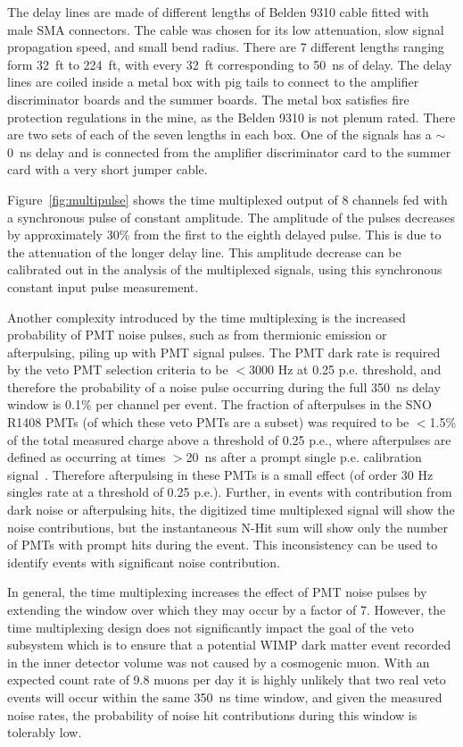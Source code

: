 \documentclass[review,number,sort&compress]{elsarticle}
\begin{document}
The delay lines are made of different lengths of Belden 9310 cable
fitted with male SMA connectors. The cable was chosen for its low
attenuation, slow signal propagation speed, and small bend radius.
There are 7 different lengths ranging form 32~ft to 224~ft, with every
32~ft corresponding to 50~ns of delay. The delay lines are coiled
inside a metal box with pig tails to connect to the amplifier
discriminator boards and the summer boards. The metal box satisfies
fire protection regulations in the mine, as the Belden 9310 is not
plenum rated. There are two sets of each of the seven lengths in each
box.  One of the signals has a $\sim$0~ns delay and is connected from
the amplifier discriminator card to the summer card with a very short
jumper cable.

Figure~\ref{fig:multipulse} shows the time multiplexed output of 8
channels fed with a synchronous pulse of constant amplitude.  The
amplitude of the pulses decreases by approximately 30\% from the first
to the eighth delayed pulse.  This is due to the attenuation of the
longer delay line.  This amplitude decrease can be calibrated out in
the analysis of the multiplexed signals, using this synchronous
constant input pulse measurement.

Another complexity introduced by the time multiplexing is the
increased probability of PMT noise pulses, such as from thermionic
emission or afterpulsing, piling up with PMT signal pulses.  The PMT
dark rate is required by the veto PMT selection criteria to be $<$3000
Hz at 0.25 p.e. threshold, and therefore the probability of a noise
pulse occurring during the full 350~ns delay window is 0.1\% per
channel per event.  The fraction of afterpulses in the SNO R1408 PMTs
(of which these veto PMTs are a subset) was required to be $<$1.5\% of
the total measured charge above a threshold of 0.25 p.e., where
afterpulses are defined as occurring at times $>$20~ns after a prompt
single p.e.  calibration signal~\cite{ref:sno_pmt_paper}.  Therefore
afterpulsing in these PMTs is a small effect (of order 30 Hz singles
rate at a threshold of 0.25 p.e.).  Further, in events with
contribution from dark noise or afterpulsing hits, the digitized time
multiplexed signal will show the noise contributions, but the
instantaneous N-Hit sum will show only the number of PMTs with prompt
hits during the event. This inconsistency can be used to identify
events with significant noise contribution.

In general, the time multiplexing increases the effect of PMT noise
pulses by extending the window over which they may occur by a factor
of 7. However, the time multiplexing design does not significantly
impact the goal of the veto subsystem which is to ensure that a
potential WIMP dark matter event recorded in the inner detector volume
was not caused by a cosmogenic muon. With an expected count rate of
9.8 muons per day it is highly unlikely that two real veto events will
occur within the same 350~ns time window, and given the measured noise
rates, the probability of noise hit contributions during this window
is tolerably low.
\end{document}
